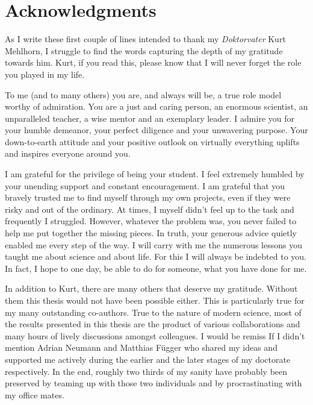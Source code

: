\null\vfill

\section*{Acknowledgments}
	
	As I write these first couple of lines intended to thank my \emph{Doktorvater} Kurt Mehlhorn, I struggle to find the words capturing the depth of my gratitude towards him. Kurt, if you read this, please know that I will never forget the role you played in my life.

	To me (and to many others) you are, and always will be, a true role model worthy of admiration. You are a just and caring person, an enormous scientist, an unparalleled teacher, a wise mentor and an exemplary leader. I admire you for your humble demeanor, your perfect diligence and your unwavering purpose. Your down-to-earth attitude and your positive outlook on virtually everything uplifts and inspires everyone around you.

	I am grateful for the privilege of being your student. I feel extremely humbled by your unending support and constant encouragement. I am grateful that you bravely trusted me to find myself through my own projects, even if they were risky and out of the ordinary. At times, I myself didn't feel up to the task and frequently I struggled. However, whatever the problem was, you never failed to help me put together the missing pieces. In truth, your generous advice quietly enabled me every step of the way. I will carry with me the numerous lessons you taught me about science and about life. For this I will always be indebted to you. In fact, I hope to one day, be able to do for someone, what you have done for me.\bigskip
	
	In addition to Kurt, there are many others that deserve my gratitude. Without them this thesis would not have been possible either. This is particularly true for my many outstanding co-authors. True to the nature of modern science, most of the results presented in this thesis are the product of various collaborations and many hours of lively discussions amongst colleagues. I would be remiss If I didn't mention Adrian Neumann and Matthias F\"ugger who shared my ideas and supported me actively during the earlier and the later stages of my doctorate respectively. In the end, roughly two thirds of my sanity have probably been preserved by teaming up with those two individuals and by procrastinating with my office mates.\bigskip

